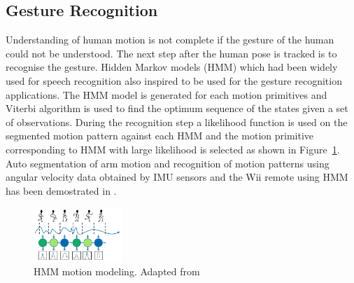 \subsection{Gesture Recognition}
	Understanding of human motion is not complete if the gesture of the human could not be understood. The next step after the human pose is tracked is to recognise the gesture. Hidden Markov models (HMM) which had been widely used for speech recognition \cite{rabiner1989tutorial} also inspired to be used for the gesture recognition applications. The HMM model is generated for each motion primitives and Viterbi algorithm is used to find the optimum sequence of the states given a set of observations. During the recognition step a likelihood function is used on the segmented motion pattern against each HMM and the motion primitive corresponding to HMM with large likelihood is selected as shown in Figure~\ref{fig:hmm}. Auto segmentation of arm motion and recognition of motion patterns using angular velocity data obtained by IMU sensors and the Wii remote using HMM has been demostrated in \cite{aoki2013segmentation}. 
\begin{figure}[H]
\centering
\includegraphics[width=0.3\textwidth]{assets/HMM.png}
\caption[HMM motion modeling]{HMM motion modeling. {Adapted from \cite{aoki2013segmentation}}}
\label{fig:hmm}
\end{figure}
